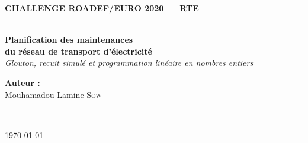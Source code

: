 \documentclass[11pt,a4paper]{report}
\begin{document}
\begin{titlepage}
    \begin{center}

        \noindent\colorbox{BleuFonce}{%
            \parbox{\dimexpr\textwidth-2\fboxsep\relax}{%
                \centering
                \vspace{0.4cm}
                {\color{white}\small\textbf{CHALLENGE ROADEF/EURO 2020 --- RTE}}
                \vspace{0.2cm}
            }%
        }\\[0.4cm]

        {\huge\textbf{Planification des maintenances}}\\[0.3cm]
        {\LARGE\textbf{du réseau de transport d'électricité}}\\[0.2cm]
        {\large\textit{Glouton, recuit simulé et programmation linéaire en nombres entiers}}\\[0.4cm]

        \noindent{\color{BleuFonce}\rule{\linewidth}{2pt}}

        \vfill

        {\large\textbf{Auteur :}}\\[0.2cm]
        {\small Mouhamadou Lamine \textsc{Sow}}

        \vfill

        \textcolor{GrisMoyen}{\rule{\linewidth}{0.4pt}}\\[0.5em]
        {\large\today}

    \end{center}
\end{titlepage}

\begin{abstract}
Le challenge ROADEF/EURO 2020, proposé par RTE, consiste à planifier les interventions de
maintenance du réseau de transport d'électricité en minimisant un risque incertain, décrit par des
scénarios : on pénalise à la fois le risque moyen et l'excès du quantile à 95\,\% (ou 50\,\%) sur ce
risque moyen, sous des contraintes de ressources et d'exclusion. Nous comparons trois méthodes sur
les 15 instances A, au temps de calcul du challenge (15 minutes) : un glouton trié par un score de
difficulté, suivi d'une réparation ; un recuit simulé suivi d'une descente, qui part du glouton ; et
une programmation linéaire en nombres entiers (PLNE) résolue par Gurobi, renforcée par des coupes
sur le quantile. Le recuit, réglé sur trois instances et évalué à part sur les douze autres, est en
moyenne à 0,52\,\% de la meilleure valeur connue du challenge (meilleure de cinq graines : 0,39\,\%),
contre 2,83\,\% pour le glouton. La PLNE prouve l'optimum de huit instances et fournit une borne
inférieure sur les autres ; les coupes de quantile ramènent le gap certifié de A\_02 de 55,94\,\% à
1,32\,\%. Toutes les solutions sont validées par le checker officiel.
\end{abstract}
\end{document}
